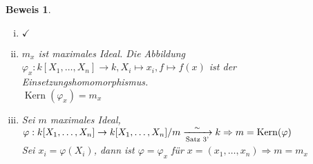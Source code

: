 \documentclass[a4paper,12pt]{report}
\theoremstyle{break}
\theoremstyle{nonumberbreak}
\newtheorem{Bew}{Beweis}
\theoremstyle{nonumberplain}
\DeclareMathOperator{\Kern}{Kern}
\begin{document}
\begin{Bew}\begin{enumerate}[(iii)]
\item[(i)$\to$(ii)] $\checkmark$

\item[(ii)$\to$(iii)]
$m_x$ ist maximales Ideal. Die Abbildung $\varphi_x:k[X_1,\dots ,X_n]\to k, X_i\mapsto x_i, f\mapsto f(x)$ ist der Einsetzungshomomorphismus.\\
$\Kern(\varphi_x)=m_x$

\item[(iii)$\to$(i)]
Sei $m$ maximales Ideal, $\varphi:k[X_1,\dots ,X_n]\to k[X_1,\dots ,X_n]/m  \xrightarrow[\textrm{Satz 3'}]{\sim} k\\
\Rightarrow m=\Kern(\varphi)$\\
Sei $x_i=\varphi(X_i)$, dann ist $\varphi=\varphi_x$ f\"ur $x=(x_1,\dots ,x_n) \Rightarrow m=m_x$
\end{enumerate}\end{Bew}
\end{document}
